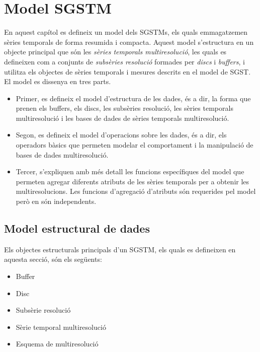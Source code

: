 \chapter{Model SGSTM}
\label{cap:model:sgstm}

En aquest capítol es defineix un model dels \glspl{SGSTM}, els quals
emmagatzemen sèries temporals de forma resumida i compacta. Aquest
model s'estructura en un objecte principal que són les \emph{sèries
  temporals multiresolució}, les quals es defineixen com a conjunts de
\emph{subsèries resolució} formades per \emph{discs} i \emph{buffers},
i utilitza els objectes de sèries temporals i mesures descrits en el
model de \gls{SGST}.  El model es dissenya en tres parts.

\begin{itemize}
\item Primer, es defineix el model d'estructura de les dades, és a
  dir, la forma que prenen els buffers, els discs, les subsèries
  resolució, les sèries temporals multiresolució i les bases de dades
  de sèries temporals multiresolució.

\item Segon, es defineix el model d'operacions sobre les dades, és a
  dir, els operadors bàsics que permeten modelar el comportament i la
  manipulació de bases de dades multiresolució.

\item Tercer, s'expliquen amb més detall les funcions específiques del
  model que permeten agregar diferents atributs de les sèries
  temporals per a obtenir les multiresolucions. Les funcions
  d'agregació d'atributs són requerides pel model però en són
  independents.
\end{itemize}




\section{Model estructural de dades}


Els objectes estructurals principals d'un \gls{SGSTM}, els quals es
defineixen en aquesta secció, són els següents:
\begin{itemize}
\item Buffer
\item Disc
\item Subsèrie resolució
\item Sèrie temporal multiresolució
\item Esquema de multiresolució
\end{itemize}


